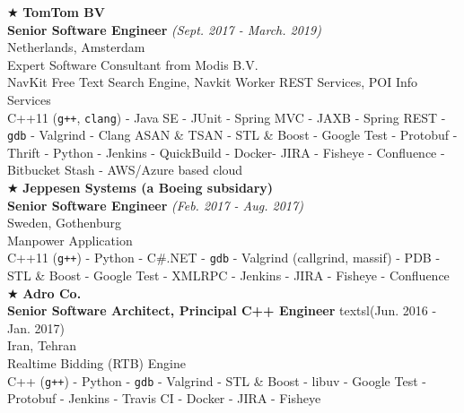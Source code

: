 \documentclass[10pt,a4paper]{article}
\begin{document}
\noindent $\bigstar$ \hspace{0.1cm} \large \textbf{TomTom BV} \\
\indent \small \textbf{Senior Software Engineer} \textsl{(Sept. 2017 - March. 2019)} \\
\indent \textnormal{Netherlands, Amsterdam} \\
\indent \textbullet \hspace{0.05cm} Expert Software Consultant from Modis B.V. \\
\indent \textbullet \hspace{0.05cm} NavKit Free Text Search Engine, Navkit Worker REST Services, POI Info Services \\
\indent \textbullet \hspace{0.05cm} C++11 (\texttt{g++}, \texttt{clang}) - Java SE - JUnit - Spring MVC - JAXB - Spring REST -  \texttt{gdb} - Valgrind - Clang ASAN \& TSAN - STL \& Boost - Google Test - Protobuf - Thrift - Python - Jenkins - QuickBuild - Docker- JIRA - Fisheye - Confluence - Bitbucket Stash - AWS/Azure based cloud \\

\noindent $\bigstar$ \hspace{0.1cm} \large \textbf{Jeppesen Systems (a Boeing subsidary)} \\
\indent \small \textbf{Senior Software Engineer} \textsl{(Feb. 2017 - Aug. 2017)} \\
\indent \textnormal{Sweden, Gothenburg} \\
\indent \textbullet \hspace{0.05cm} Manpower Application \\
\indent \textbullet \hspace{0.05cm} C++11 (\texttt{g++}) - Python - C\#.NET - \texttt{gdb} - Valgrind (callgrind, massif) - PDB - STL \& Boost - Google Test - XMLRPC - Jenkins - JIRA - Fisheye - Confluence \\

\noindent $\bigstar$ \hspace{0.1cm} \large \textbf{Adro Co.} \\
\indent \small \textbf{Senior Software Architect, Principal C++ Engineer} textsl{(Jun. 2016 - Jan. 2017)} \\
\indent \textnormal{Iran, Tehran} \\
\indent \textbullet \hspace{0.05cm} Realtime Bidding (RTB) Engine \\
\indent \textbullet \hspace{0.05cm} C++ (\texttt{g++}) - Python - \texttt{gdb} - Valgrind - STL \& Boost - libuv - Google Test - Protobuf - Jenkins - Travis CI - Docker - JIRA - Fisheye \\
\end{document}
